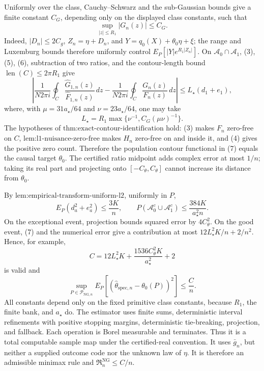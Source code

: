 Uniformly over the class, Cauchy--Schwarz and the sub-Gaussian bounds give a finite constant \(C_G\), depending only on the displayed class constants, such that
\[
 \sup_{|z|\le R_1}|G_n(z)|\le C_G. \tag{6}
\]
Indeed, \(|D_n|\le2C_g\), \(Z_n=\eta+D_n\), and \(Y=q_0(X)+\theta_0\eta+\xi\); the range and Luxemburg bounds therefore uniformly control \(E_P[|Y|e^{R_1|Z_n|}]\). On \(\mathcal A_0\cap\mathcal A_1\), (3), (5), (6), subtraction of two ratios, and the contour-length bound \(\operatorname{len}(C)\le2\pi R_1\) give
\[
 \left|
 \frac{1}{N2\pi i}\oint_C
 \frac{\widehat G_{1,n}(z)}{\widehat F_{1,n}(z)}\,dz
 -
 \frac{1}{N2\pi i}\oint_C
 \frac{G_n(z)}{F_n(z)}\,dz
 \right|
 \le L_{\star}(d_1+e_1), \tag{7}
\]
where, with \(\mu=31a_{\star}/64\) and \(\nu=23a_{\star}/64\), one may take
\[
 L_{\star}=R_1\max\{\nu^{-1},C_G(\mu\nu)^{-1}\}.
\]
The hypotheses of \(\text{thm:exact-contour-identification}\) hold: (3) makes \(F_n\) zero-free on \(C\), \(\text{lem:l1-nuisance-zero-free}\) makes \(H_n\) zero-free on and inside it, and (4) gives the positive zero count. Therefore the population contour functional in (7) equals the causal target \(\theta_0\). The certified ratio midpoint adds complex error at most \(1/n\); taking its real part and projecting onto \([-C_{\theta},C_{\theta}]\) cannot increase its distance from \(\theta_0\).

By \(\text{lem:empirical-transform-uniform-l2}\), uniformly in \(P\),
\[
 E_P(d_a^2+e_a^2)\le\frac{3K}{n},
 \qquad
 P(\mathcal A_0^c\cup\mathcal A_1^c)
 \le\frac{384K}{a_{\star}^2n}. \tag{8}
\]
On the exceptional event, projection bounds squared error by \(4C_{\theta}^2\). On the good event, (7) and the numerical error give a contribution at most \(12L_{\star}^2K/n+2/n^2\). Hence, for example,
\[
 C=12L_{\star}^2K+\frac{1536C_{\theta}^2K}{a_{\star}^2}+2
\]
is valid and
\[
 \sup_{P\in\mathcal P_{\mathrm{NG},n}}
 E_P[(\widehat\theta_{\mathrm{spec},n}-\theta_0(P))^2]
 \le\frac Cn. \tag{9}
\]
All constants depend only on the fixed primitive class constants, because \(R_1\), the finite bank, and \(a_{\star}\) do. The estimator uses finite sums, deterministic interval refinements with positive stopping margins, deterministic tie-breaking, projection, and fallback. Each operation is Borel measurable and terminates. Thus it is a total computable sample map under the certified-real convention. It uses \(\bar g_n\), but neither a supplied outcome code nor the unknown law of \(\eta\). It is therefore an admissible minimax rule and \(\mathfrak R_n^{\mathrm{NG}}\le C/n\).

